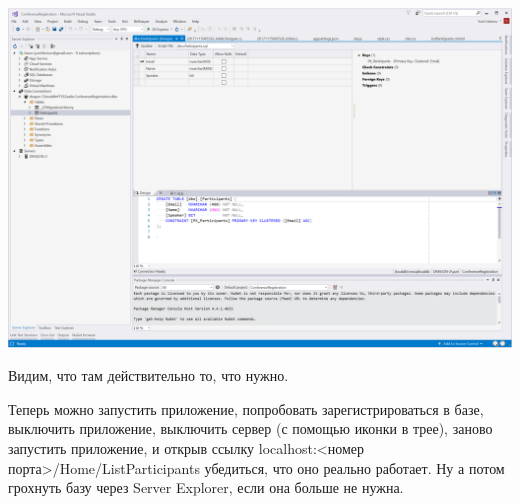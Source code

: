 \documentclass[a5paper]{article}
\begin{document}
\begin{center}
	\includegraphics[width=\textwidth]{databaseView.png}
\end{center}

Видим, что там действительно то, что нужно.

Теперь можно запустить приложение, попробовать зарегистрироваться в базе, выключить приложение, выключить сервер (с помощью иконки в трее), заново запустить приложение, и открыв ссылку localhost:<номер порта>/Home/ListParticipants убедиться, что оно реально работает.
Ну а потом грохнуть базу через Server Explorer, если она больше не нужна.
\end{document}
